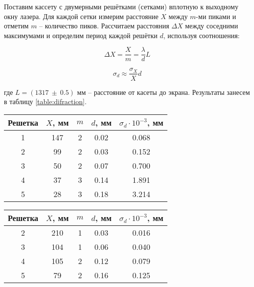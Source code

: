     Поставим кассету с двумерными решётками (сетками) вплотную к выходному окну лазера. Для каждой сетки измерим расстояние $X$ между $m$-ми пиками и отметим $m$ -- количество пиков. Рассчитаем расстояния $\Delta X$ между соседними максимумами и определим период каждой решётки $d$, используя соотношения:
    
    \begin{equation}
    \Delta X=\frac{X}{m}=\frac{\lambda}{d} L
    \end{equation}
    
    \[ \sigma_d \approx \frac{\sigma_X}{X} d \]
    
    где $L = (1317 ~ \pm ~ 0.5)$ мм -- расстояние от касеты до экрана. Результаты занесем в таблицу \ref{table:difraction}.
    
	\begin{minipage}{0.5\textwidth}
		\centering
		\begin{tabular}{|c|c|c|c|c|}
			\hline
			Решетка    & $X$, мм  & $m$ & $d$, мм & $\sigma_d \cdot 10^{-3}$, мм\\ \hline
			1          & 147      & 2   & 0.02    & 0.068\\ \hline
			2          & 99       & 2   & 0.03    & 0.152\\ \hline
			3          & 50       & 2   & 0.07    & 0.700\\ \hline
			4          & 37       & 3   & 0.14    & 1.891\\ \hline
			5          & 28       & 3   & 0.18    & 3.214\\ \hline
		\end{tabular}
		\label{table:difraction}
	\end{minipage}
	\begin{minipage}{0.55\textwidth}
		\centering
		\begin{tabular}{|c|c|c|c|c|}
			\hline
			Решетка    & $X$, мм   & $m$ & $d$, мм & $\sigma_d \cdot 10^{-3}$, мм\\ \hline
			2          & 210       & 1   & 0.03    & 0.016\\ \hline
			3          & 104       & 1   & 0.06    & 0.040\\ \hline
			4          & 105       & 2   & 0.12    & 0.079\\ \hline
			5          & 79        & 2   & 0.16    & 0.125\\ \hline
		\end{tabular}
		\label{table:lense_difractiton}
	\end{minipage}
    
